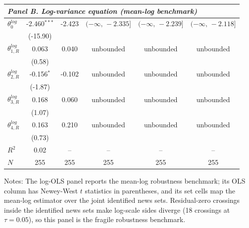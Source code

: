 \begin{table}[!htbp]
\begin{threeparttable}
\begin{tabular}{lccccc}
\midrule
\multicolumn{6}{l}{\textit{Panel B. Log-variance equation (mean-log benchmark)}} \\
\midrule
$\theta^{log}_0$ & -2.460$^{***}$ & -2.423 & $(-\infty,\,-2.335]$ & $(-\infty,\,-2.239]$ & $(-\infty,\,-2.118]$ \\
 & (-15.90) &  &  &  &  \\
\midrule
$\theta^{log}_{1,R}$ & 0.063 & 0.040 & unbounded & unbounded & unbounded \\
 & (0.58) &  &  &  &  \\
$\theta^{log}_{2,R}$ & -0.156$^{*}$ & -0.102 & unbounded & unbounded & unbounded \\
 & (-1.87) &  &  &  &  \\
$\theta^{log}_{3,R}$ & 0.168 & 0.060 & unbounded & unbounded & unbounded \\
 & (1.07) &  &  &  &  \\
$\theta^{log}_{4,R}$ & 0.163 & 0.210 & unbounded & unbounded & unbounded \\
 & (0.73) &  &  &  &  \\
\midrule
$R^2$ & 0.02 & -- & -- & -- & -- \\
$N$ & 255 & 255 & 255 & 255 & 255 \\
\bottomrule
\end{tabular}
\begin{tablenotes}[flushleft]
\scriptsize
\item Notes: The log-OLS panel reports the mean-log robustness benchmark; its OLS column has Newey-West $t$ statistics in parentheses, and its set cells map the mean-log estimator over the joint identified news sets. Residual-zero crossings inside the identified news sets make log-scale sides diverge (18 crossings at $\tau{=}0.05$), so this panel is the fragile robustness benchmark.
\end{tablenotes}
\end{threeparttable}
\end{table}
\clearpage
